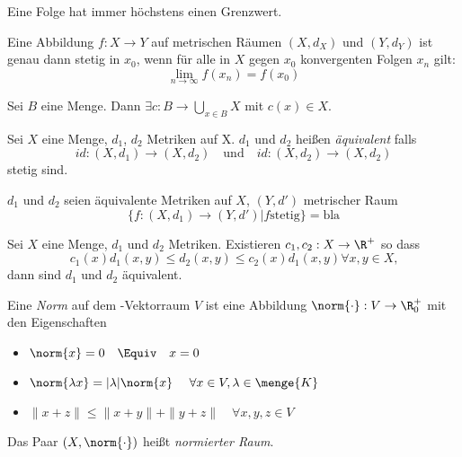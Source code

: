 \begin{stz}
    Eine Folge hat immer höchstens einen Grenzwert.
\end{stz}

\begin{stz}
    Eine Abbildung $f: X \to Y$ auf metrischen Räumen $(X, d_X)$ und $(Y, d_Y)$ ist
    genau dann stetig in $x_0$, wenn für alle in $X$ gegen $x_0$ konvergenten Folgen
    $x_n$ gilt: \[\lim_{n\to \infty} f(x_n) = f(x_0)\]
\end{stz}

\begin{axm}[Auswahlaxiom]
    Sei $B$ eine Menge. Dann $\exists c: B \to \bigcup_{x\in B} X$ mit $c(x)\in X$.   
\end{axm}

\begin{dfn}
    Sei $X$ eine Menge, $d_1$, $d_2$ Metriken auf X. $d_1$ und $d_2$ heißen
    \emph{äquivalent} falls
    \[id: (X, d_1) \to (X, d_2) \quad \text{und}\quad id: (X, d_2) \to (X, d_2)\]
    stetig sind.

\begin{bem}
    $d_1$ und $d_2$ seien äquivalente Metriken auf $X$, $(Y, d')$ metrischer Raum
    \[\{f:(X, d_1) \to (Y, d') | f \text{stetig} \} = \text{bla}\]
\end{bem}
\end{dfn}

\begin{stz}
    Sei $X$ eine Menge, $d_1$ und $d_2$ Metriken. Existieren $c_1, c_2: X\to
    \R^+$ so dass
    \[c_1(x)d_1(x, y) \leq d_2(x,y) \leq c_2(x)d_1(x,y) \forall x,y \in X\text{,}\]
    dann sind $d_1$ und $d_2$ äquivalent.
\end{stz}

\begin{dfn}
    Eine \emph{Norm} auf dem -Vektorraum $V$ ist eine Abbildung
    $\norm{\cdot}: V \to \R^+_0$ mit den Eigenschaften
    \begin{itemize}
        \item $\norm{x} = 0 \quad \Equiv \quad x = 0$
        \item $\norm{\lambda x} = |\lambda| \norm{x} \
                    \quad \forall x \in V, \lambda \in \menge{K}$
        \item $\|x + z\| \leq \|x + y\| + \|y + z\| \quad \forall x,y,z \in V$
    \end{itemize}
    Das Paar $(X, \norm{\cdot})$ heißt \emph{normierter Raum}.
\end{dfn}

